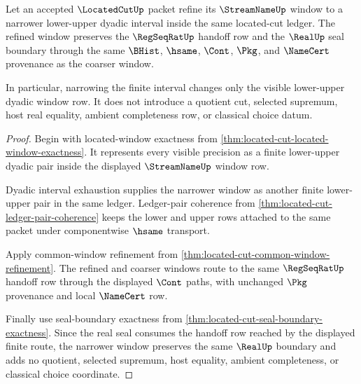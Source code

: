 \begin{theorem}
\label{thm:located-cut-window-monotonic-refinement}
Let an accepted $\LocatedCutUp$ packet refine its $\StreamNameUp$ window to a narrower lower-upper dyadic interval inside the same located-cut ledger. The refined window preserves the $\RegSeqRatUp$ handoff row and the $\RealUp$ seal boundary through the same $\BHist$, $\hsame$, $\Cont$, $\Pkg$, and $\NameCert$ provenance as the coarser window.

In particular, narrowing the finite interval changes only the visible lower-upper dyadic window row. It does not introduce a quotient cut, selected supremum, host real equality, ambient completeness row, or classical choice datum.
\end{theorem}
\begin{proof}
Begin with located-window exactness from \autoref{thm:located-cut-located-window-exactness}. It represents every visible precision as a finite lower-upper dyadic pair inside the displayed $\StreamNameUp$ window row.

Dyadic interval exhaustion supplies the narrower window as another finite lower-upper pair in the same ledger. Ledger-pair coherence from \autoref{thm:located-cut-ledger-pair-coherence} keeps the lower and upper rows attached to the same packet under componentwise $\hsame$ transport.

Apply common-window refinement from \autoref{thm:located-cut-common-window-refinement}. The refined and coarser windows route to the same $\RegSeqRatUp$ handoff row through the displayed $\Cont$ paths, with unchanged $\Pkg$ provenance and local $\NameCert$ row.

Finally use seal-boundary exactness from \autoref{thm:located-cut-seal-boundary-exactness}. Since the real seal consumes the handoff row reached by the displayed finite route, the narrower window preserves the same $\RealUp$ boundary and adds no quotient, selected supremum, host equality, ambient completeness, or classical choice coordinate.
\end{proof}

